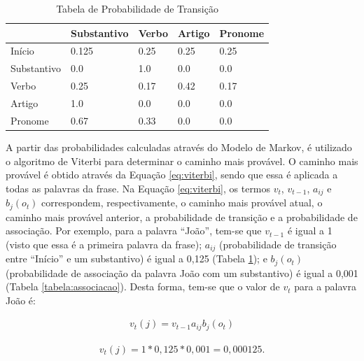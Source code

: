 \begin{table}[htb]
\centering
\begin{tabular}{|l|l|l|l|l|}
\hline
& Substantivo & Verbo & Artigo & Pronome \\ \hline
Início      & 0.125       & 0.25  & 0.25   & 0.25    \\ \hline
Substantivo & 0.0         & 1.0   & 0.0    & 0.0     \\ \hline
Verbo       & 0.25        & 0.17  & 0.42   & 0.17    \\ \hline
Artigo      & 1.0         & 0.0   & 0.0    & 0.0     \\ \hline
Pronome     & 0.67        & 0.33  & 0.0    & 0.0     \\ \hline
\end{tabular}
\caption{Tabela de Probabilidade de Transição}
\label{tabela:transicao}
\end{table}

A partir das probabilidades calculadas através do Modelo de Markov, é
utilizado o algoritmo de Viterbi para determinar o caminho mais provável. O
caminho mais provável é obtido através da Equação \ref{eq:viterbi}, sendo que
essa é aplicada a todas as palavras da frase. Na Equação \ref{eq:viterbi}, os
termos $v_t$, $v_{t-1}$, $a_{ij}$ e $b_j(o_t)$ correspondem, respectivamente, o
caminho mais provável atual, o caminho mais provável anterior, a probabilidade
de transição e a probabilidade de associação.
Por exemplo, para a palavra ``João'', tem-se que $v_{t-1}$ é igual a
1 (visto que essa é a primeira palavra
da frase);
$a_{ij}$ (probabilidade de transição entre ``Início'' e um substantivo) é
igual a 0,125 (Tabela \ref{tabela:transicao}); e $b_j(o_t)$ (probabilidade de
associação da palavra João com um substantivo) é igual a 0,001 (Tabela
\ref{tabela:associacao}).
Desta forma, tem-se que o valor de $v_t$ para a palavra João é:

\begin{equation}
\begin{split}
v_t(j) = v_{t-1} a_{ij} b_j(o_t)
\end{split}
\label{eq:viterbi}
\end{equation}



\begin{equation}
\begin{split}
v_t(j) = 1 * 0,125 * 0,001 = 0,000125.
\end{split}
\label{eq:joao}
\end{equation}



